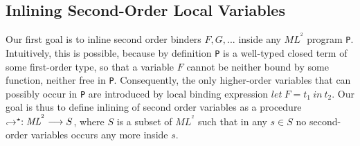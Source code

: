 \documentclass[a4paper,11pt,oneside]{article}
\theoremstyle{plain}
\newcommand{\tmlet}[3]{let~#1=#2~in~#3}
\newcommand{\bwedge}{\boldsymbol{~\wedge~}}
\newcommand{\inlsrc}{\textit{ML}^{^2}}
\newcommand{\hookdownarrow}{\mathrel{\rotatebox[origin=c]{180}{$\hookleftarrow$}}}
\newcommand{\inlletstar}{\hookdownarrow^{\star}}
\begin{document}
	
%


\subsection{Inlining Second-Order Local Variables}
	Our first goal is to inline second order binders $F,G,...$ inside any $\inlsrc$ program \texttt{P}. 
	Intuitively, this is possible, because by definition \texttt{P} is a well-typed closed term of some first-order type, so that a variable $F$ cannot be neither bound by some function, neither free in \texttt{P}. Consequently, the only higher-order variables that can possibly occur in \texttt{P} are introduced by local binding expression $\tmlet{F}{t_1}{t_2}$.
	Our goal is thus to define inlining of second order variables as a procedure  $\inlletstar : \inlsrc \longrightarrow S$, where $S$ is a subset of $\inlsrc$ such that 
	 in any $s \in S$ no second-order variables occurs any more inside $s$. \\
	 
\end{document}
